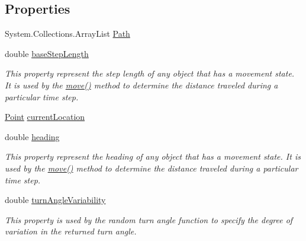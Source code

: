 \subsection*{Properties}
\begin{DoxyCompactItemize}
\item 
System.\-Collections.\-Array\-List \hyperlink{class_s_e_a_r_c_h_1_1_mover_aaf46431549d9887e3710f2831cd906db}{Path}
\item 
double \hyperlink{class_s_e_a_r_c_h_1_1_mover_aee1e8a76587d4b51e7db5b475b86ac97}{base\-Step\-Length}
\begin{DoxyCompactList}\small\item\em This property represent the step length of any object that has a movement state. It is used by the \hyperlink{class_s_e_a_r_c_h_1_1_mover_ab2dfc659f3817ea48d66ff4d7e464d1d}{move()} method to determine the distance traveled during a particular time step. \end{DoxyCompactList}\item 
\hyperlink{class_s_e_a_r_c_h_1_1_point}{Point} \hyperlink{class_s_e_a_r_c_h_1_1_mover_adbd8f2d23d7a01350e2d598b15a0447d}{current\-Location}
\item 
double \hyperlink{class_s_e_a_r_c_h_1_1_mover_a460b88ef4c0b1be0b4dfb20bb7d8cc6c}{heading}
\begin{DoxyCompactList}\small\item\em This property represent the heading of any object that has a movement state. It is used by the \hyperlink{class_s_e_a_r_c_h_1_1_mover_ab2dfc659f3817ea48d66ff4d7e464d1d}{move()} method to determine the distance traveled during a particular time step. \end{DoxyCompactList}\item 
double \hyperlink{class_s_e_a_r_c_h_1_1_mover_ad26237e095a0ed3f40e097c699a22310}{turn\-Angle\-Variability}
\begin{DoxyCompactList}\small\item\em This property is used by the random turn angle function to specify the degree of variation in the returned turn angle. \end{DoxyCompactList}\item 

\end{DoxyCompactItemize}
